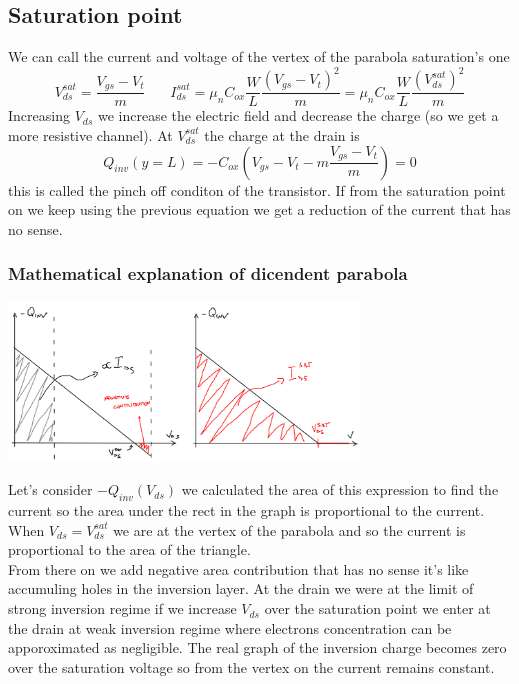 \subsection{Saturation point}
We can call the current and voltage of the vertex of the parabola saturation's one 
\begin{equation}
V_{ds}^{sat}=\frac{V_{gs}-V_t}{m}\ \ \ \ \ \ \ \ I_{ds}^{sat}=\mu_nC_{ox}\frac{W}{L}\frac{(V_{gs}-V_t)^2}{m}=\mu_nC_{ox}\frac{W}{L}\frac{(V_{ds}^{sat})^2}{m}
\end{equation}
Increasing $V_{ds}$ we increase the electric field and decrease the charge (so we get a more resistive channel). At $V_{ds}^{sat}$ the charge at the drain is 
\begin{equation}
Q_{inv}(y=L)=-C_{ox}(V_{gs}-V_t-m \frac{V_{gs}-V_t}{m})=0
\end{equation}
this is called the pinch off conditon of the transistor. If from the saturation point on we keep using the previous equation we get a reduction of the current that has no sense.\\

\subsubsection{Mathematical explanation of dicendent parabola}

\centering
\includegraphics[width=0.7\textwidth]{mathexpl.png}\\
\raggedright

Let's consider $-Q_{inv}(V_{ds})$ we calculated the area of this expression to find the current so the area under the rect in the graph is proportional to the current. When $V_{ds}=V_{ds}^{sat}$ we are at the vertex of the parabola and so the current is proportional to the area of the triangle.\\
From there on we add negative area contribution that has no sense it's like accumuling holes in the inversion layer. At the drain we were at the limit of strong inversion regime if we increase $V_{ds}$ over the saturation point we enter at the drain at weak inversion regime where electrons concentration can be apporoximated as negligible. The real graph of the inversion charge becomes zero over the saturation voltage so from the vertex on the current remains constant.\\

